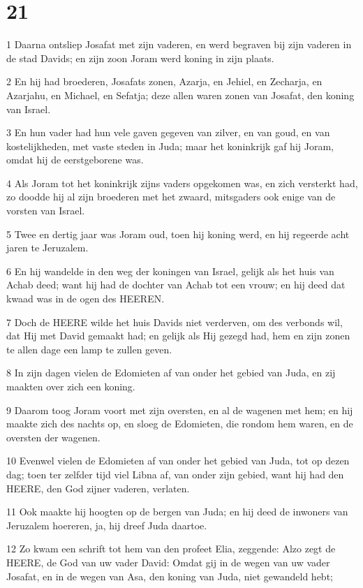 \chapter{21}

\par 1 Daarna ontsliep Josafat met zijn vaderen, en werd begraven bij zijn vaderen in de stad Davids; en zijn zoon Joram werd koning in zijn plaats.
\par 2 En hij had broederen, Josafats zonen, Azarja, en Jehiel, en Zecharja, en Azarjahu, en Michael, en Sefatja; deze allen waren zonen van Josafat, den koning van Israel.
\par 3 En hun vader had hun vele gaven gegeven van zilver, en van goud, en van kostelijkheden, met vaste steden in Juda; maar het koninkrijk gaf hij Joram, omdat hij de eerstgeborene was.
\par 4 Als Joram tot het koninkrijk zijns vaders opgekomen was, en zich versterkt had, zo doodde hij al zijn broederen met het zwaard, mitsgaders ook enige van de vorsten van Israel.
\par 5 Twee en dertig jaar was Joram oud, toen hij koning werd, en hij regeerde acht jaren te Jeruzalem.
\par 6 En hij wandelde in den weg der koningen van Israel, gelijk als het huis van Achab deed; want hij had de dochter van Achab tot een vrouw; en hij deed dat kwaad was in de ogen des HEEREN.
\par 7 Doch de HEERE wilde het huis Davids niet verderven, om des verbonds wil, dat Hij met David gemaakt had; en gelijk als Hij gezegd had, hem en zijn zonen te allen dage een lamp te zullen geven.
\par 8 In zijn dagen vielen de Edomieten af van onder het gebied van Juda, en zij maakten over zich een koning.
\par 9 Daarom toog Joram voort met zijn oversten, en al de wagenen met hem; en hij maakte zich des nachts op, en sloeg de Edomieten, die rondom hem waren, en de oversten der wagenen.
\par 10 Evenwel vielen de Edomieten af van onder het gebied van Juda, tot op dezen dag; toen ter zelfder tijd viel Libna af, van onder zijn gebied, want hij had den HEERE, den God zijner vaderen, verlaten.
\par 11 Ook maakte hij hoogten op de bergen van Juda; en hij deed de inwoners van Jeruzalem hoereren, ja, hij dreef Juda daartoe.
\par 12 Zo kwam een schrift tot hem van den profeet Elia, zeggende: Alzo zegt de HEERE, de God van uw vader David: Omdat gij in de wegen van uw vader Josafat, en in de wegen van Asa, den koning van Juda, niet gewandeld hebt;
